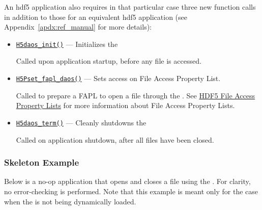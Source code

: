 \documentclass[../users_guide.tex]{subfiles}
\begin{document}
An \acrshort{hdf5} \dvc{} application also requires in that particular case three new
function calls in addition to those for an equivalent \acrshort{hdf5} application (see
Appendix~\ref{apdx:ref_manual} for more details):

\begin{itemize}
 \item \texttt{\hyperref[ref:h5daos_init]{H5daos\_init()}} --- Initializes the \dvc{}

    Called upon application startup, before any file is accessed.

 \item \texttt{\hyperref[ref:h5pset_fapl_daos]{H5Pset\_fapl\_daos()}} --- Sets \dvc{} access on File Access Property List.

    Called to prepare a FAPL to open a file through the \dvc{}. See \href{https://support.hdfgroup.org/HDF5/Tutor/property.html#fa}{HDF5 File Access Property Lists} for more information about File Access Property Lists.

 \item \texttt{\hyperref[ref:h5daos_term]{H5daos\_term()}} --- Cleanly shutdowns the \dvc{}

    Called on application shutdown, after all files have been closed.
\end{itemize}

\subsubsection{Skeleton Example}

Below is a no-op application that opens and closes a file using the \dvc{}.
For clarity, no error-checking is performed. Note that this example is
meant only for the case when the \dvc{} is not being dynamically loaded.
\end{document}
